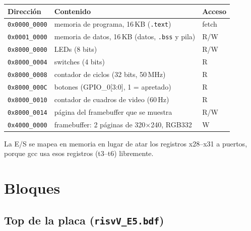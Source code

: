 \documentclass[11pt,a4paper]{article}
\newcommand{\code}[1]{\texttt{#1}}
\begin{document}
\begin{center}
\begin{tabular}{lll}
\toprule
Dirección & Contenido & Acceso \\
\midrule
\code{0x0000\_0000} & memoria de programa, 16\,KB (\code{.text}) & fetch \\
\code{0x0001\_0000} & memoria de datos, 16\,KB (datos, \code{.bss} y pila) & R/W \\
\code{0x8000\_0000} & LEDs (8 bits) & R/W \\
\code{0x8000\_0004} & switches (4 bits) & R \\
\code{0x8000\_0008} & contador de ciclos (32 bits, 50\,MHz) & R \\
\code{0x8000\_000C} & botones (GPIO\_0[3:0], 1 = apretado) & R \\
\code{0x8000\_0010} & contador de cuadros de video (60\,Hz) & R \\
\code{0x8000\_0014} & página del framebuffer que se muestra & R/W \\
\code{0x4000\_0000} & framebuffer: 2 páginas de 320$\times$240, RGB332 & W \\
\bottomrule
\end{tabular}
\end{center}

La E/S se mapea en memoria en lugar de atar los registros x28--x31 a puertos, porque gcc usa esos registros (t3--t6) libremente.

\section{Bloques}

\subsection{Top de la placa (\code{risvV\_E5.bdf})}
\end{document}
